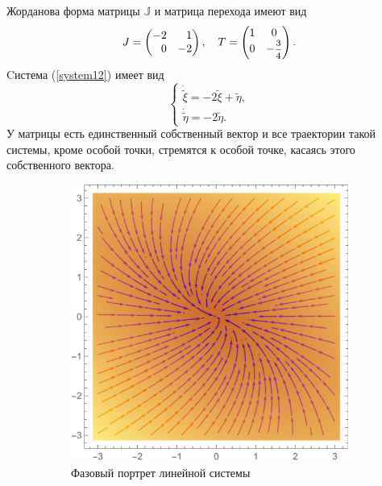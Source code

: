 \documentclass[12pt, a4paper]{article}
\begin{document}
\begin{enumerate}
Жорданова форма матрицы $\mathbb{J}$ и матрица перехода имеют вид
\[
J=\begin{pmatrix}
	-2 & \phantom{-}1 \\
	\phantom{-}0 & -2
\end{pmatrix},
\quad
T=\begin{pmatrix}
	1 & 0 \\
	0 & -\hbox{\footnotesize$\displaystyle\frac{3}{4}$}
\end{pmatrix}.
\]
Cистема (\ref{system12}) имеет вид
\[
\begin{cases}
	\dot{\tilde{\xi}}=-2\tilde{\xi}+\tilde{\eta},\\
	\dot{\tilde{\eta}}=-2\tilde{\eta}.
\end{cases}
\]
У матрицы есть единственный собственный вектор и все траектории такой системы, кроме особой точки, стремятся к особой точке, касаясь этого собственного вектора.
\begin{figure}[H]
	\centering
	\begin{subfigure}[H]{0.4\textwidth}
		\includegraphics[width=\textwidth]{p3_1}
		\caption{Фазовый портрет линейной системы}
		\label{oldfazov}
	\end{subfigure}
	\qquad\qquad
	\begin{subfigure}[H]{0.4\textwidth}

\end{subfigure}
\end{figure}
\end{enumerate}
\end{document}
